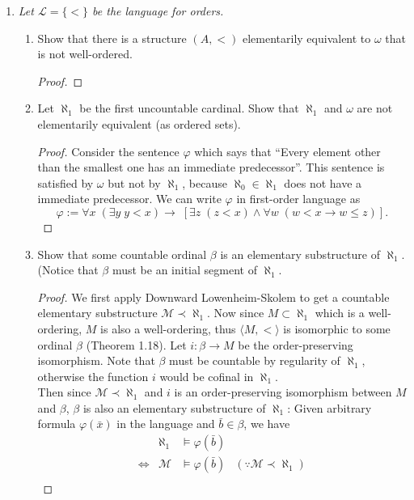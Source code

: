 \documentclass{article}
\begin{document}
\begin{enumerate}[label={\bf Q\arabic*:}]
  \item \it Let $\mathcal{L}=\{<\}$ be the language for orders.
    \begin{enumerate}[label={\bf(\arabic*)}]
      \item Show that there is a structure $(A,<)$ elementarily equivalent
        to $\omega$ that is not well-ordered.

        \begin{proof}
        \end{proof}

      \item Let $\aleph_1$ be the first uncountable cardinal. Show that
        $\aleph_1$ and $\omega$ are not elementarily equivalent (as ordered
        sets).
        \begin{proof}
          Consider the sentence $\varphi$ which says that ``Every element
          other than the smallest one has an immediate predecessor''. This
          sentence is satisfied by $\omega$ but not by $\aleph_1$, because
          $\aleph_0\in\aleph_1$ does not have a immediate predecessor. We
          can write $\varphi$ in first-order language as
          \[\varphi:= \forall x\; (\exists y\; y<x)\rightarrow\;
            \left[\exists z\; (z<x)\wedge \forall w\; (w<x\rightarrow w\leq
            z) \right].\]
        \end{proof}

      \item Show that some countable ordinal $\beta$ is an elementary
        substructure of $\aleph_1$. (Notice that $\beta$ must be an initial
        segment of $\aleph_1$.

        \begin{proof}
          We first apply Downward Lowenheim-Skolem to get a countable
          elementary substructure $\mathcal{M}\prec\aleph_1$. Now since
          $M\subset\aleph_1$ which is a well-ordering, $M$ is also a
          well-ordering, thus $\langle M,<\rangle$ is isomorphic to some
          ordinal $\beta$ (Theorem 1.18). Let $i:\beta\rightarrow M$ be the
          order-preserving isomorphism. Note that $\beta$ must be countable
          by regularity of $\aleph_1$, otherwise the function $i$ would be
          cofinal in $\aleph_1$. \\

          Then since $\mathcal{M}\prec\aleph_1$ and $i$ is an
          order-preserving isomorphism between $M$ and $\beta$, $\beta$ is
          also an elementary substructure of $\aleph_1$: Given arbitrary
          formula $\varphi(\bar{x})$ in the language and
          $\bar{b}\in\beta$, we have
          \[\begin{array}{crlr}
            &\aleph_1 &\models\varphi(\bar{b}) & \\
            \Leftrightarrow &\mathcal{M} &\models\varphi(\bar{b})
              &(\because\mathcal{M}\prec\aleph_1) \\
          \end{array}\]
        \end{proof}
    \end{enumerate}
\end{enumerate}
\end{document}
